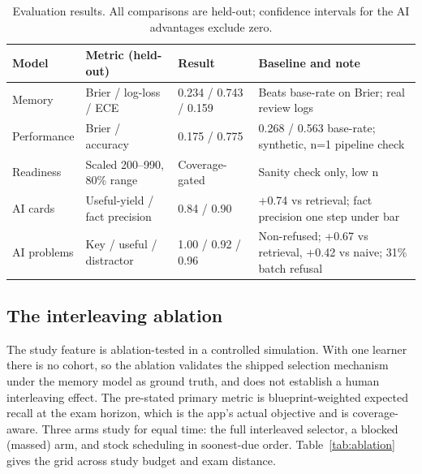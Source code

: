 \documentclass[11pt]{article}
\begin{document}
\begin{table}[t]
\centering
\small
\begin{tabular}{@{}p{2.6cm}p{3.5cm}p{2.6cm}p{4.4cm}@{}}
\toprule
\textbf{Model} & \textbf{Metric (held-out)} & \textbf{Result} & \textbf{Baseline and note} \\
\midrule
Memory & Brier / log-loss / ECE & 0.234 / 0.743 / 0.159 & Beats base-rate on Brier; real review logs \\
Performance & Brier / accuracy & 0.175 / 0.775 & 0.268 / 0.563 base-rate; synthetic, n=1 pipeline check \\
Readiness & Scaled 200--990, 80\% range & Coverage-gated & Sanity check only, low n \\
AI cards & Useful-yield / fact precision & 0.84 / 0.90 & +0.74 vs retrieval; fact precision one step under bar \\
AI problems & Key / useful / distractor & 1.00 / 0.92 / 0.96 & Non-refused; +0.67 vs retrieval, +0.42 vs naive; 31\% batch refusal \\
\bottomrule
\end{tabular}
\caption{Evaluation results. All comparisons are held-out; confidence intervals for
the AI advantages exclude zero.}
\label{tab:eval}
\end{table}

\subsection{The interleaving ablation}

The study feature is ablation-tested in a controlled simulation. With one learner
there is no cohort, so the ablation validates the shipped selection mechanism under
the memory model as ground truth, and does not establish a human interleaving effect.
The pre-stated primary metric is blueprint-weighted expected recall at the exam
horizon, which is the app's actual objective and is coverage-aware. Three arms study
for equal time: the full interleaved selector, a blocked (massed) arm, and stock
scheduling in soonest-due order. Table~\ref{tab:ablation} gives the grid across study
budget and exam distance.
\end{document}
